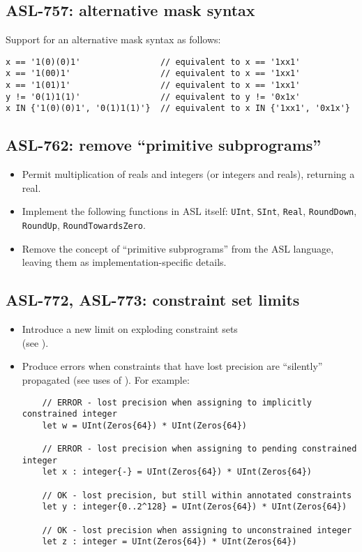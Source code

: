 \subsection{ASL-757: alternative mask syntax}
Support for an alternative mask syntax as follows:
\begin{lstlisting}
x == '1(0)(0)1'                // equivalent to x == '1xx1'
x == '1(00)1'                  // equivalent to x == '1xx1'
x == '1(01)1'                  // equivalent to x == '1xx1'
y != '0(1)1(1)'                // equivalent to y != '0x1x'
x IN {'1(0)(0)1', '0(1)1(1)'}  // equivalent to x IN {'1xx1', '0x1x'}
\end{lstlisting}

\subsection{ASL-762: remove ``primitive subprograms''}
\begin{itemize}
  \item Permit multiplication of reals and integers (or integers and reals), returning a real.
  \item Implement the following functions in ASL itself: \texttt{UInt}, \texttt{SInt}, \texttt{Real}, \texttt{RoundDown}, \texttt{RoundUp}, \texttt{RoundTowardsZero}.
  \item Remove the concept of ``primitive subprograms'' from the ASL language, leaving them as implementation-specific details.
\end{itemize}

\subsection{ASL-772, ASL-773: constraint set limits}
\begin{itemize}
  \item Introduce a new limit on exploding constraint sets \\ (see ).
  \item Produce errors when constraints that have lost precision are ``silently'' propagated (see uses of ). For example:
  \begin{lstlisting}
    // ERROR - lost precision when assigning to implicitly constrained integer
    let w = UInt(Zeros{64}) * UInt(Zeros{64})

    // ERROR - lost precision when assigning to pending constrained integer
    let x : integer{-} = UInt(Zeros{64}) * UInt(Zeros{64})

    // OK - lost precision, but still within annotated constraints
    let y : integer{0..2^128} = UInt(Zeros{64}) * UInt(Zeros{64})

    // OK - lost precision when assigning to unconstrained integer
    let z : integer = UInt(Zeros{64}) * UInt(Zeros{64})
  \end{lstlisting}
\end{itemize}

